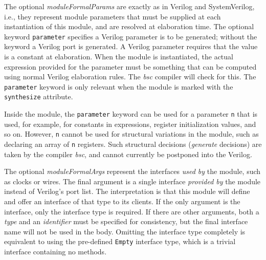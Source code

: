 \documentclass[twoside,letterpaper]{article}
\newcommand{\bsc}{\emph{bsc}}
\newcommand{\SV}{SystemVerilog}
\newcommand{\V}{Verilog}
\newcommand{\te}[1]{\texttt{#1}}
\newcommand{\nterm}[1]{\emph{#1}}
\newcommand{\term}[1]{\texttt{#1}}
\begin{document}
The optional \nterm{moduleFormalParams} are exactly as in {\V} and
{\SV}, i.e., they represent module parameters that must be supplied at
each instantiation of this module, and are resolved at elaboration
time.  The optional keyword \term{parameter} specifies a {\V}
parameter is to be generated; without the keyword a
{\V} port is generated.  A {\V} parameter requires that the value is a
constant at elaboration.  When the module is instantiated, the actual
expression provided for the parameter must be something that can be
computed using normal Verilog elaboration rules.  The {\bsc} compiler
will check for this.  The \term{parameter} keyword is only relevant
when the module is marked with the \te{synthesize} attribute.

Inside the module, the \te{parameter} keyword can be used for a
parameter \te{n} that is used, for example, for constants in
expressions, register initialization values, and so on.  However,
\te{n} cannot be used for structural variations in the module, such as
declaring an array of \te{n} registers.  Such structural decisions
({\em generate} decisions) are taken by the compiler {\bsc}, and
cannot currently be postponed into the Verilog.




 


The optional
\nterm{moduleFormalArgs} represent the interfaces \emph{used by} the
module, such as clocks or wires.  The final argument is 
 a single interface \emph{provided by} the module
instead of {\V}'s port list.  The
interpretation is that this module will define and offer an interface
of that type to its clients.  If the only argument is the interface,
only the interface type is required.  If there are other arguments, both a
\nterm{type} and an \nterm{identifier} must be specified for
consistency, but the final interface name  will not be
used in the body.  
Omitting the interface type completely is
equivalent to using the pre-defined \texttt{Empty} interface type, which
is a trivial interface containing no methods.
\end{document}
